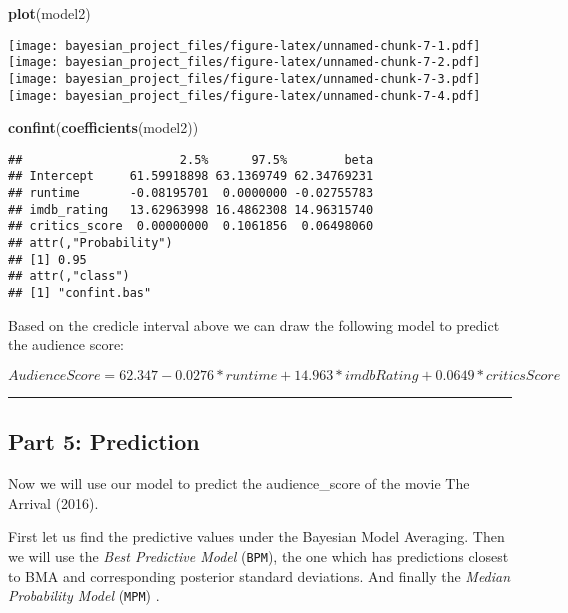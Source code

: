 \documentclass[]{article}
\newenvironment{Shaded}{\begin{snugshade}}{\end{snugshade}}
\newcommand{\KeywordTok}[1]{\textcolor[rgb]{0.13,0.29,0.53}{\textbf{#1}}}
\newcommand{\NormalTok}[1]{#1}
\begin{document}
\begin{Shaded}
\begin{Highlighting}[]
\KeywordTok{plot}\NormalTok{(model2)}
\end{Highlighting}
\end{Shaded}

\texttt{[image: bayesian\_project\_files/figure-latex/unnamed-chunk-7-1.pdf]}
\texttt{[image: bayesian\_project\_files/figure-latex/unnamed-chunk-7-2.pdf]}
\texttt{[image: bayesian\_project\_files/figure-latex/unnamed-chunk-7-3.pdf]}
\texttt{[image: bayesian\_project\_files/figure-latex/unnamed-chunk-7-4.pdf]}

\begin{Shaded}
\begin{Highlighting}[]
\KeywordTok{confint}\NormalTok{(}\KeywordTok{coefficients}\NormalTok{(model2))}
\end{Highlighting}
\end{Shaded}

\begin{verbatim}
##                      2.5%      97.5%        beta
## Intercept     61.59918898 63.1369749 62.34769231
## runtime       -0.08195701  0.0000000 -0.02755783
## imdb_rating   13.62963998 16.4862308 14.96315740
## critics_score  0.00000000  0.1061856  0.06498060
## attr(,"Probability")
## [1] 0.95
## attr(,"class")
## [1] "confint.bas"
\end{verbatim}

Based on the credicle interval above we can draw the following model to
predict the audience score:

\[Audience Score = 62.347 - 0.0276*runtime + 14.963*imdbRating + 0.0649*criticsScore\]

\begin{center}\rule{0.5\linewidth}{\linethickness}\end{center}

\subsection{Part 5: Prediction}\label{part-5-prediction}

Now we will use our model to predict the audience\_score of the movie
The Arrival (2016).

First let us find the predictive values under the Bayesian Model
Averaging. Then we will use the \emph{Best Predictive Model}
(\texttt{BPM}), the one which has predictions closest to BMA and
corresponding posterior standard deviations. And finally the
\emph{Median Probability Model} (\texttt{MPM}) .
\end{document}

